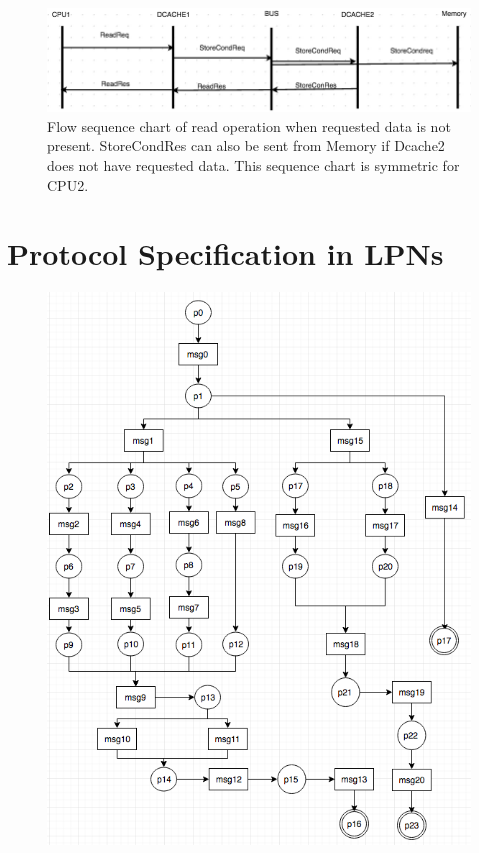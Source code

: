 \documentclass[12pt,frontmatter,copyright,thesis]{usfmanus}
\begin{document}
\begin{appendix}
\begin{figure}[h]
 \centerline{
 \includegraphics[width=3.9In]{figures/read2.png}}
 \caption{\footnotesize Flow sequence chart of read operation when requested data is not present. StoreCondRes can also be sent from Memory if Dcache2 does not have requested data. This sequence chart is symmetric for CPU2. }
 \label{read2}
 \end{figure}
\newpage
\section{Protocol Specification in LPNs}%
\begin{figure}[h]
\centerline{
 \includegraphics[width=3.1In]{figures/Fig5.png}}%

\end{figure}
\end{appendix}
\end{document}
